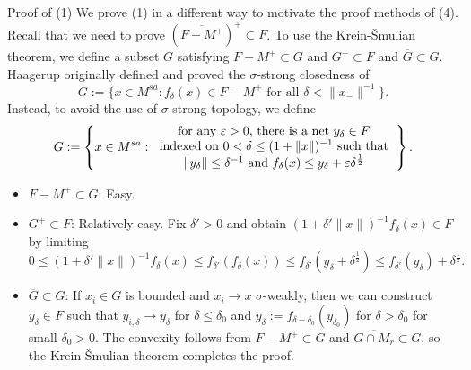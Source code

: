 \documentclass{../../../../slide}
\begin{document}
\begin{frame}{Proof of (1)}
We prove (1) in a different way to motivate the proof methods of (4).
Recall that we need to prove $(\overline{F-M^+})^+\subset F$.
To use the Krein-\v Smulian theorem, we define a subset $G$ satisfying $F-M^+\subset G$ and $G^+\subset F$ and $\overline G\subset G$.
\pause
Haagerup originally defined and proved the $\sigma$-strong closedness of
\[G:=\{x\in M^{sa}:f_\delta(x)\in F-M^+\text{ for all }\delta<\|x_-\|^{-1}\}.\]
Instead, to avoid the use of $\sigma$-strong topology, we define
\[G:=\left\{x\in M^{sa}:\begin{tabular}{c}
for any $\varepsilon>0$, there is a net $y_\delta\in F$\\
indexed on $0<\delta\le(1+\|x\|)^{-1}$ such that\\
$\|y_\delta\|\le\delta^{-1}$ and $f_\delta(x)\le y_\delta+\varepsilon\delta^{\frac12}$
\end{tabular}\right\}.\]
\pause
\begin{itemize}
\item $F-M^+\subset G$: Easy.
\item $G^+\subset F$: Relatively easy. Fix $\delta'>0$ and obtain $(1+\delta'\|x\|)^{-1}f_\delta(x)\in F$ by limiting
\[0\le(1+\delta'\|x\|)^{-1}f_\delta(x)\le f_{\delta'}(f_\delta(x))\le f_{\delta'}(y_\delta+\delta^{\frac12})\le f_{\delta'}(y_\delta)+\delta^{\frac12}.\]
\item $\overline G\subset G$: If $x_i\in G$ is bounded and $x_i\to x$ $\sigma$-weakly, then we can construct $y_\delta\in F$ such that $y_{i,\delta}\to y_\delta$ for $\delta\le\delta_0$ and $y_\delta:=f_{\delta-\delta_0}(y_{\delta_0})$ for $\delta>\delta_0$ for small $\delta_0>0$.
The convexity follows from $F-M^+\subset G$ and $\overline{G\cap M_r}\subset G$, so the Krein-\v Smulian theorem completes the proof.
\end{itemize}
\end{frame}
\end{document}
